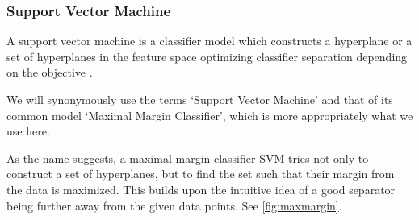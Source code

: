 
\subsubsection{Support Vector Machine}
A support vector machine is a classifier model which constructs a hyperplane or
a set of hyperplanes in the feature space optimizing classifier separation
depending on the objective \cite{cortes1995support}.

We will synonymously use the terms `Support Vector Machine' and that of its
common model `Maximal Margin Classifier', which is more appropriately what we
use here.

As the name suggests, a maximal margin classifier SVM tries not only to
construct a set of hyperplanes, but to find the set such that their margin from
the data is maximized. This builds upon the intuitive idea of a good separator
being further away from the given data points. See \autoref{fig:maxmargin}.


